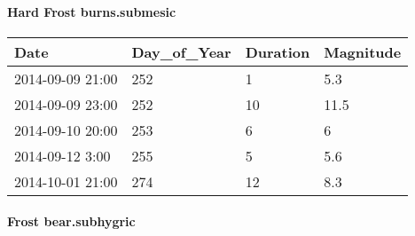 \documentclass[
]{article}
\begin{document}
\hypertarget{hard-frost-burns.submesic}{%
\paragraph{Hard Frost burns.submesic}\label{hard-frost-burns.submesic}}

\begin{tabular}{l|l|l|l}
\hline
Date & Day\_of\_Year & Duration & Magnitude\\
\hline
2014-09-09 21:00 & 252 & 1 & 5.3\\
\hline
2014-09-09 23:00 & 252 & 10 & 11.5\\
\hline
2014-09-10 20:00 & 253 & 6 & 6\\
\hline
2014-09-12 3:00 & 255 & 5 & 5.6\\
\hline
2014-10-01 21:00 & 274 & 12 & 8.3\\
\hline
\end{tabular}

\hypertarget{frost-bear.subhygric}{%
\paragraph{Frost bear.subhygric}\label{frost-bear.subhygric}}
\end{document}
